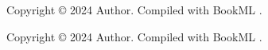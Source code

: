 \documentclass[oneside,11pt]{amsart}
\begin{document}
\begin{lxFooter}
  Copyright \copyright{} 2024 Author. Compiled with BookML \BookMLversion.
\end{lxFooter}

\iflatexml\else
\bigskip
\begin{center}
  {\small Copyright \copyright{} 2024 Author. Compiled with BookML \BookMLversion.}
\end{center}
\fi
\end{document}
